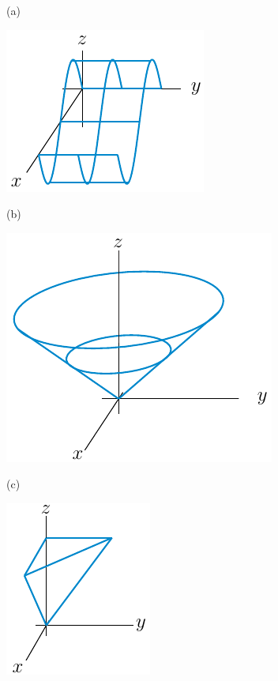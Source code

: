 \begin{answer}
(a) 
\begin{center}
     \includegraphics{fig/sinGraph.pdf}
\end{center}

(b) 
\begin{center}
     \includegraphics{fig/coneGraph.pdf}
\end{center}

(c)
\begin{center}
   \includegraphics{fig/pmidGraph.pdf}\qquad\qquad
\end{center}
\end{answer}

